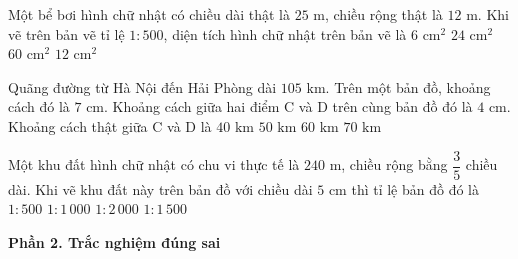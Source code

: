 \begin{ex} %
Một bể bơi hình chữ nhật có chiều dài thật là $25\text{ m}$, chiều rộng thật là $12\text{ m}$. Khi vẽ trên bản vẽ tỉ lệ $1 : 500$, diện tích hình chữ nhật trên bản vẽ là
\choice
{$6\text{ cm}^2$}
{$24\text{ cm}^2$}
{$60\text{ cm}^2$}
{\True $12\text{ cm}^2$}
\end{ex}

\begin{ex} %
Quãng đường từ Hà Nội đến Hải Phòng dài $105\text{ km}$. Trên một bản đồ, khoảng cách đó là $7\text{ cm}$. Khoảng cách giữa hai điểm C và D trên cùng bản đồ đó là $4\text{ cm}$. Khoảng cách thật giữa C và D là
\choice
{$40\text{ km}$}
{$50\text{ km}$}
{\True $60\text{ km}$}
{$70\text{ km}$}
\end{ex}

\begin{ex} %
Một khu đất hình chữ nhật có chu vi thực tế là $240\text{ m}$, chiều rộng bằng $\dfrac{3}{5}$ chiều dài. Khi vẽ khu đất này trên bản đồ với chiều dài $5\text{ cm}$ thì tỉ lệ bản đồ đó là
\choice
{$1 : 500$}
{$1 : 1\,000$}
{$1 : 2\,000$}
{\True $1 : 1\,500$}
\end{ex}

\textbf{Phần 2. Trắc nghiệm đúng sai}

